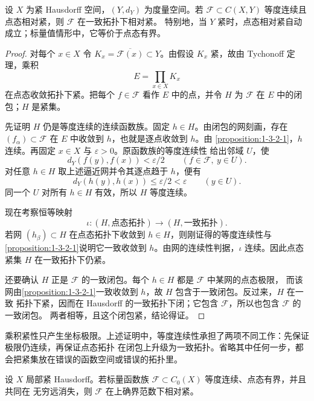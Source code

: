 \begin{theorem}[\ArzelaAscoli{}：紧域]\label{theorem:1-3-2-2}
设 $X$ 为紧 Hausdorff 空间，$(Y,d_Y)$ 为度量空间。若
$\mathcal F\subset C(X,Y)$ 等度连续且点态相对紧，则 $\mathcal F$ 在一致拓扑下相对紧。
特别地，当 $Y$ 紧时，点态相对紧自动成立；标量值情形中，它等价于点态有界。
\end{theorem}

\begin{proof}
对每个 $x\in X$ 令 $K_x=\overline{\mathcal F(x)}\subset Y$。由假设 $K_x$ 紧，故由
Tychonoff 定理，乘积
\[
  E=\prod_{x\in X}K_x
\]
在点态收敛拓扑下紧。把每个 $f\in\mathcal F$ 看作 $E$ 中的点，并令 $H$ 为 $\mathcal F$ 在 $E$
中的闭包；$H$ 是紧集。

先证明 $H$ 仍是等度连续的连续函数族。固定 $h\in H$。由闭包的网刻画，存在
$(f_\alpha)\subset\mathcal F$ 在 $E$ 中收敛到 $h$，也就是逐点收敛到 $h$。由
\cref{proposition:1-3-2-1}，$h$ 连续。再固定 $x\in X$ 与 $\varepsilon>0$。原函数族的等度连续性
给出邻域 $U$，使
\[
 d_Y(f(y),f(x))<\varepsilon/2
 \qquad(f\in\mathcal F,\ y\in U).
\]
对任意 $h\in H$ 取上述逼近网并令其逐点趋于 $h$，便有
\[
 d_Y(h(y),h(x))\le\varepsilon/2<\varepsilon
 \qquad(y\in U).
\]
同一个 $U$ 对所有 $h\in H$ 有效，所以 $H$ 等度连续。

现在考察恒等映射
\[
 \iota:(H,\text{点态拓扑})\longrightarrow(H,\text{一致拓扑}).
\]
若网 $(h_\beta)\subset H$ 在点态拓扑下收敛到 $h\in H$，则刚证得的等度连续性与
\cref{proposition:1-3-2-1}说明它一致收敛到 $h$。由网的连续性判据，$\iota$ 连续。因此点态紧集
$H$ 在一致拓扑下仍紧。

还要确认 $H$ 正是 $\mathcal F$ 的一致闭包。每个 $h\in H$ 都是 $\mathcal F$ 中某网的点态极限，
而该网由\cref{proposition:1-3-2-1}一致收敛到 $h$，故 $H$ 包含于一致闭包。反过来，$H$ 在一致
拓扑下紧，因而在 Hausdorff 的一致拓扑下闭；它包含 $\mathcal F$，所以也包含 $\mathcal F$ 的一致闭包。
两者相等，且这个闭包紧，结论得证。
\end{proof}

乘积紧性只产生坐标极限。上述证明中，等度连续性承担了两项不同工作：先保证极限仍连续，再保证点态拓扑
在闭包上升级为一致拓扑。省略其中任何一步，都会把紧集放在错误的函数空间或错误的拓扑里。

\begin{theorem}[\ArzelaAscoli{}：$C_0$ 版]\label{theorem:1-3-2-3}
设 $X$ 局部紧 Hausdorff。若标量函数族 $\mathcal F\subset C_0(X)$ 等度连续、点态有界，并且共同在
无穷远消失，则 $\mathcal F$ 在上确界范数下相对紧。
\end{theorem}

